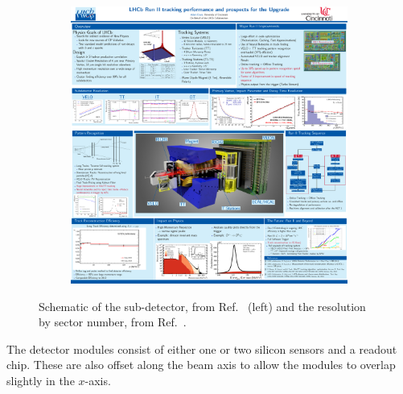 \begin{figure}[!h]
\begin{subfigure}[m]{0.49\textwidth}
        \includegraphics[width=1.0\textwidth]{figs/Detector/it_resolution.pdf}
    \end{subfigure}
    \caption{Schematic of the \intr sub-detector, from Ref.~\cite{Alves:2008zz} (left) and the \intr resolution by sector number, from Ref.~\cite{LHCb-DP-2014-002}.}
    \label{fig:Dec_it_scematic}   
\end{figure}




The detector modules consist of either one or two silicon sensors and a readout chip. These are also offset along the beam axis to allow the modules to overlap slightly in the $x$-axis.







